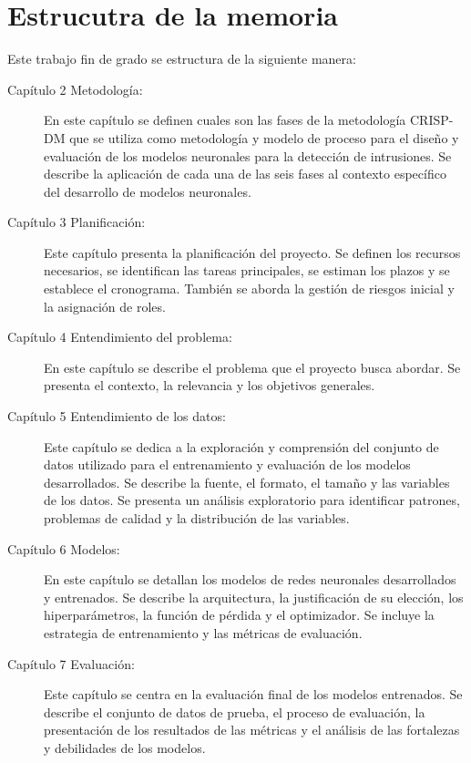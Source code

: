 \section{Estrucutra de la memoria} \label{sec.estr-memoria}

Este trabajo fin de grado se estructura de la siguiente manera:
\begin{description}
\item[Capítulo 2 Metodología:] En este capítulo se definen cuales son las fases de la metodología CRISP-DM que se utiliza como metodología y modelo de proceso para el diseño y evaluación de los modelos neuronales para la detección de intrusiones. Se describe la aplicación de cada una de las seis fases al contexto específico del desarrollo de modelos neuronales.

\item[Capítulo 3 Planificación:] Este capítulo presenta la planificación del proyecto. Se definen los recursos necesarios, se identifican las tareas principales, se estiman los plazos y se establece el cronograma. También se aborda la gestión de riesgos inicial y la asignación de roles.

\item[Capítulo 4 Entendimiento del problema:] En este capítulo se describe el problema que el proyecto busca abordar. Se presenta el contexto, la relevancia y los objetivos generales.

\item[Capítulo 5 Entendimiento de los datos:] Este capítulo se dedica a la exploración y comprensión del conjunto de datos utilizado para el entrenamiento y evaluación de los modelos desarrollados. Se describe la fuente, el formato, el tamaño y las variables de los datos. Se presenta un análisis exploratorio para identificar patrones, problemas de calidad y la distribución de las variables.

\item[Capítulo 6 Modelos:] En este capítulo se detallan los modelos de redes neuronales desarrollados y entrenados. Se describe la arquitectura, la justificación de su elección, los hiperparámetros, la función de pérdida y el optimizador. Se incluye la estrategia de entrenamiento y las métricas de evaluación.

\item[Capítulo 7 Evaluación:] Este capítulo se centra en la evaluación final de los modelos entrenados. Se describe el conjunto de datos de prueba, el proceso de evaluación, la presentación de los resultados de las métricas y el análisis de las fortalezas y debilidades de los modelos.


\end{description}
